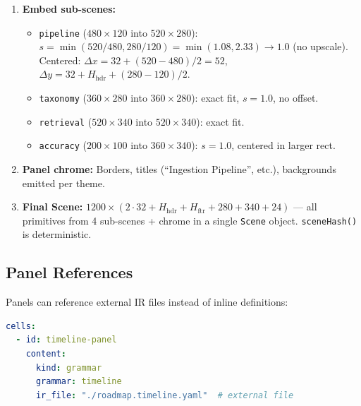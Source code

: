 \begin{enumerate}
  \item \textbf{Embed sub-scenes:}
  \begin{itemize}
    \item \texttt{pipeline} ($480{\times}120$ into $520{\times}280$): $s = \min(520/480, 280/120) = \min(1.08, 2.33) \to 1.0$ (no upscale).  Centered: $\Delta x = 32 + (520{-}480)/2 = 52$, $\Delta y = 32 + H_{\text{hdr}} + (280{-}120)/2$.
    \item \texttt{taxonomy} ($360{\times}280$ into $360{\times}280$): exact fit, $s=1.0$, no offset.
    \item \texttt{retrieval} ($520{\times}340$ into $520{\times}340$): exact fit.
    \item \texttt{accuracy} ($200{\times}100$ into $360{\times}340$): $s=1.0$, centered in larger rect.
  \end{itemize}

  \item \textbf{Panel chrome:} Borders, titles (``Ingestion Pipeline'', etc.), backgrounds emitted per theme.

  \item \textbf{Final Scene:} $1200 \times (2 \cdot 32 + H_{\text{hdr}} + H_{\text{ftr}} + 280 + 340 + 24)$ --- all primitives from 4 sub-scenes + chrome in a single \texttt{Scene} object.  \texttt{sceneHash()} is deterministic.
\end{enumerate}





\subsection{Panel References}
\label{sec:composition-panel-refs}

Panels can reference external IR files instead of inline definitions:

\begin{lstlisting}[language=yaml,caption={Panel with external IR reference}]
cells:
  - id: timeline-panel
    content:
      kind: grammar
      grammar: timeline
      ir_file: "./roadmap.timeline.yaml"  # external file
\end{lstlisting}

